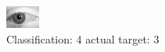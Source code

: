 \begin{figure}[h!]
\begin{center}
\includegraphics[width=0.60\columnwidth]{figures/ID2830_class_4_target_3.png}
\end{center}
\caption{ Classification: 4 actual target: 3}
\label{fig:ID2830_class_4_target_3}
\end{figure}
